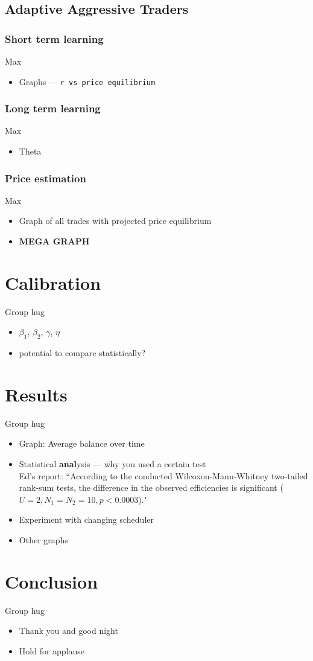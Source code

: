 \documentclass[12pt]{article} %
\begin{document}
\subsection{Adaptive Aggressive Traders}
\subsubsection{Short term learning}
Max
\begin{itemize} \itemsep0pt
	\item Graphs --- \tt r \rm vs price equilibrium
\end{itemize}

\subsubsection{Long term learning}
Max
\begin{itemize} \itemsep0pt
	\item Theta
\end{itemize}

\subsubsection{Price estimation}
Max
\begin{itemize} \itemsep0pt
	\item Graph of all trades with projected price equilibrium
	\item \textbf{MEGA GRAPH}
\end{itemize}


\section{Calibration}
Group hug
\begin{itemize} \itemsep0pt
	\item $\beta_1$, $\beta_2$, $\gamma$, $\eta$
	\item potential to compare statistically?
\end{itemize}


\section{Results}
Group hug
\begin{itemize} \itemsep0pt
	\item Graph: Average balance over time
	\item Statistical \textbf{anal}ysis --- why you used a certain test\\
Ed's report: ``According to the conducted Wilcoxon-Mann-Whitney two-tailed rank-sum tests, the difference in the observed efficiencies is significant ($U = 2, N_1 = N_2 = 10, p < 0.0003$)."
	\item Experiment with changing scheduler
	\item Other graphs
\end{itemize}

\section{Conclusion}
Group hug
\begin{itemize} \itemsep0pt
	\item Thank you and good night
	\item Hold for applause
\end{itemize}


%
%
\end{document}
